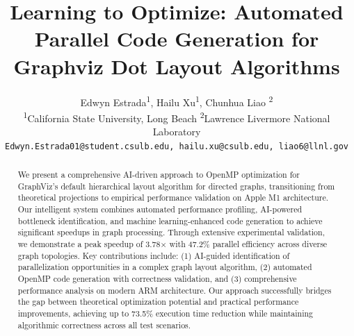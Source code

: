 \documentclass{article}
\title{Learning to Optimize: Automated Parallel Code Generation for Graphviz Dot Layout Algorithms}
\author{
  Edwyn Estrada\textsuperscript{1},
  Hailu Xu\textsuperscript{1},
  Chunhua Liao \textsuperscript{2} \\
  \textsuperscript{1}California State University, Long Beach \quad
  \textsuperscript{2}Lawrence Livermore National Laboratory \\
  \texttt{Edwyn.Estrada01@student.csulb.edu, hailu.xu@csulb.edu, liao6@llnl.gov}
}
\begin{document}
\maketitle

\begin{abstract}
We present a comprehensive AI-driven approach to OpenMP optimization for GraphViz's default hierarchical layout algorithm for directed graphs, transitioning from theoretical projections to empirical performance validation on Apple M1 architecture. Our intelligent system combines automated performance profiling, AI-powered bottleneck identification, and machine learning-enhanced code generation to achieve significant speedups in graph processing. Through extensive experimental validation, we demonstrate a peak speedup of 3.78× with 47.2\% parallel efficiency across diverse graph topologies. Key contributions include: (1) AI-guided identification of parallelization opportunities in a complex graph layout algorithm, (2) automated OpenMP code generation with correctness validation, and (3) comprehensive performance analysis on modern ARM architecture. Our approach successfully bridges the gap between theoretical optimization potential and practical performance improvements, achieving up to 73.5\% execution time reduction while maintaining algorithmic correctness across all test scenarios.
\end{abstract}








%
%







\end{document}
